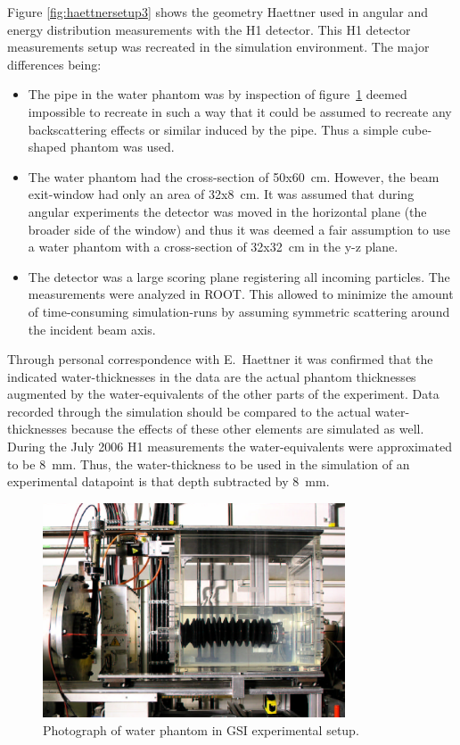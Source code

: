 Figure \ref{fig:haettnersetup3} shows the geometry Haettner used in angular and energy distribution measurements with the H1 detector. This H1 detector measurements setup was recreated in the simulation environment. The major differences being:
\begin{itemize}
\item The pipe in the water phantom was by inspection of figure~\ref{fig:ehaettnerSetupPhotograph} deemed impossible to recreate in such a way that it could be assumed to recreate any backscattering effects or similar induced by the pipe. Thus a simple cube-shaped phantom was used.
\item The water phantom had the cross-section of 50x60~cm. However, the beam exit-window had only an area of 32x8~cm. It was assumed that during angular experiments the detector was moved in the horizontal plane (the broader side of the window) and thus it was deemed a fair assumption to use a water phantom with a cross-section of 32x32~cm in the y-z plane. 
\item The detector was a large scoring plane registering all incoming particles. The measurements were analyzed in ROOT. This allowed to minimize the amount of time-consuming simulation-runs by assuming symmetric scattering around the incident beam axis.
\end{itemize}

Through personal correspondence with E.~Haettner it was confirmed that the indicated water-thicknesses in the data are the actual phantom thicknesses augmented by the water-equivalents of the other parts of the experiment. Data recorded through the simulation should be compared to the actual water-thicknesses because the effects of these other elements are simulated as well. During the July 2006 H1 measurements the water-equivalents were approximated to be 8~mm. Thus, the water-thickness to be used in the simulation of an experimental datapoint is that depth subtracted by 8~mm. %

\begin{figure}[!h] 
\begin{center}
\includegraphics[width=0.8\textwidth]{images/haettnersetup.png}  
\caption{\label{fig:ehaettnerSetupPhotograph}Photograph of water phantom in GSI experimental setup.}
\end{center}
\end{figure}

